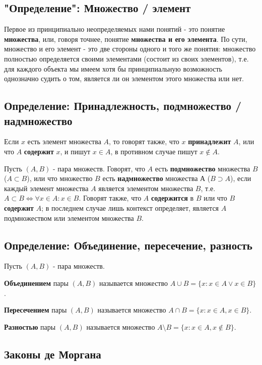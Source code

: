 \documentclass{article}
\begin{document}
\subsection{"Определение": Множество / элемент}
Первое из принципиально неопределяемых нами понятий - это понятие \textbf{множества}, или, говоря точнее, понятие \textbf{множества и его элемента}. По сути, множество и его элемент - это две стороны одного и того же понятия: множество полностью определяется своими элементами (состоит из своих элементов), т.е. для каждого объекта мы имеем хотя бы принципиальную возможность однозначно судить о том, является ли он элементом этого множества или нет.

\subsection{Определение: Принадлежность, подмножество / надмножество}

Если $x$ есть элемент множества $A$, то говорят также, что $x$ \textbf{принадлежит} $A$, или что $A$ \textbf{содержит} $x$, и пишут $x \in A$, в противном случае пишут $x \notin A$.

Пусть $(A, B)$ - пара множеств. Говорят, что $A$ есть \textbf{подмножество} множества $B$ ($A \subset B$), или что множество $B$ есть \textbf{надмножество} множества А ($B \supset A$), если каждый элемент множества $A$ является элементом множества $B$, т.е. $A \subset B \Leftrightarrow \forall x \in A : x \in B$. Говорят также, что $A$ \textbf{содержится} в $B$ или что $B$ \textbf{содержит} $A$; в последнем случае лишь контекст определяет, является $A$ подмножеством или элементом множества $B$.

\subsection{Определение: Объединение, пересечение, разность}

Пусть $(A, B)$ - пара множеств.

\textbf{Объединением} пары $(A, B)$ называется множество $A \cup B = \{x : x \in A \vee x \in B \}$.

\textbf{Пересечением} пары $(A, B)$ называется множество $A \cap B = \{x : x \in A, x \in B \}$.

\textbf{Разностью} пары $(A, B)$ называется множество $A \setminus B = \{x : x \in A, x \notin B \}$.

\subsection{Законы де Моргана}
\end{document}
